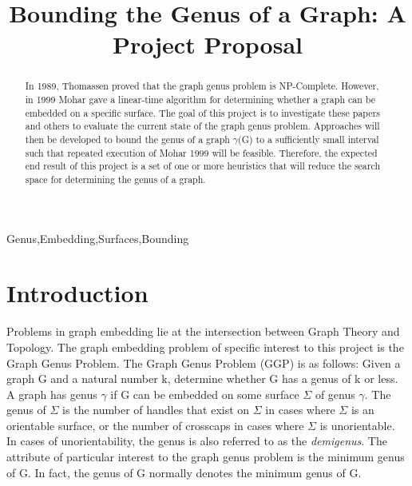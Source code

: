 \documentclass[12pt,conference]{IEEEtran}
\begin{document}
\raggedbottom

\title{Bounding the Genus of a Graph: A Project Proposal}

\author{
}

\maketitle

\begin{abstract}

In 1989, Thomassen proved that the graph genus problem is NP-Complete. However, in 1999 Mohar gave a linear-time algorithm for determining whether a graph can be embedded on a specific surface. The goal of this project is to investigate these papers and others to evaluate the current state of the graph genus problem. Approaches will then be developed to bound the genus of a graph $\gamma$(G) to a sufficiently small interval such that repeated execution of Mohar 1999 will be feasible. Therefore, the expected end result of this project is a set of one or more heuristics that will reduce the search space for determining the genus of a graph.

\end{abstract}

\begin{IEEEkeywords}
Genus,Embedding,Surfaces,Bounding
\end{IEEEkeywords}

\section{Introduction}

Problems in graph embedding lie at the intersection between Graph Theory and Topology. The graph embedding problem of specific interest to this project is the Graph Genus Problem. The Graph Genus Problem (GGP) is as follows: Given a graph G and a natural number k, determine whether G has a genus of k or less. A graph has genus $\gamma$ if G can be embedded on some surface $\Sigma$ of genus $\gamma$. The genus of $\Sigma$ is the number of handles that exist on $\Sigma$ in cases where $\Sigma$ is an orientable surface, or the number of crosscaps in cases where $\Sigma$ is unorientable. In cases of unorientability, the genus is also referred to as the \textit{demigenus}. The attribute of particular interest to the graph genus problem is the minimum genus of G. In fact, the genus of G normally denotes the minimum genus of G. 
\end{document}
